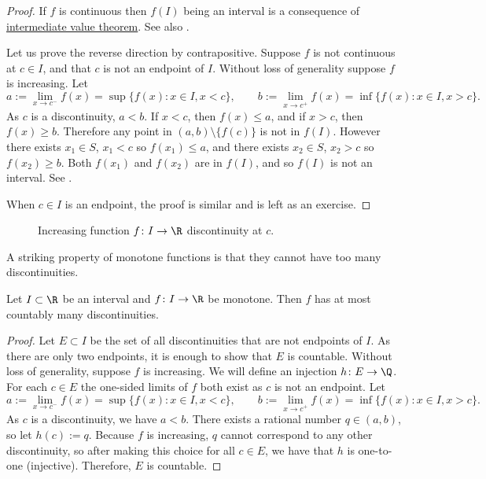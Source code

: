 \documentclass[12pt]{book}
\begin{document}
\begin{proof}
If $f$ is continuous then $f(I)$ being an interval is a consequence of
\hyperref[IVT:thm]{intermediate value theorem}.
See also
.

Let us prove the reverse direction by contrapositive.
Suppose $f$ is not continuous at $c \in I$,
and that $c$ is not an endpoint of $I$.
Without loss of generality suppose $f$ is increasing.
Let
\begin{equation*}
a := \lim_{x \to c^-} f(x) = \sup \{ f(x) : x \in I, x < c \} ,
\qquad
b := \lim_{x \to c^+} f(x) = \inf \{ f(x) : x \in I, x > c \} .
\end{equation*}
As $c$ is a discontinuity, $a < b$.
If $x < c$, then $f(x) \leq a$, and
if $x > c$, then $f(x) \geq b$.
Therefore
any point
in $(a,b) \setminus \{ f(c) \}$ is not in $f(I)$.
However there exists $x_1 \in S$, $x_1 < c$ so
$f(x_1) \leq a$, and there exists $x_2 \in S$, $x_2 > c$
so $f(x_2) \geq b$.
Both $f(x_1)$ and $f(x_2)$ are in $f(I)$,
and so $f(I)$ is not an interval.
See .

When $c \in I$ is an endpoint, the proof is similar and is left as an exercise.
\end{proof}

\begin{figure}[h!t]
\begin{center}

\caption{Increasing function $f \colon I \to \R$ discontinuity at
$c$.\label{fig:figinccont}}
\end{center}
\end{figure}

A striking property of monotone functions is that they cannot have
too many discontinuities.

\begin{cor} \label{cor:monotcountcont}
Let $I \subset \R$ be an interval and
$f \colon I \to \R$ be monotone.
Then $f$ has at most
countably many discontinuities.
\end{cor}

\begin{proof}
Let $E \subset I$ be the set of all discontinuities
that are not endpoints of $I$.
As there are
only two endpoints, it is enough to show that $E$ is countable.
Without loss of generality, suppose $f$ is increasing.
We will define an injection $h \colon E \to \Q$.
For each $c \in E$
the one-sided limits of $f$ both exist as $c$ is not an endpoint.
Let
\begin{equation*}
a := \lim_{x \to c^-} f(x) = \sup \{ f(x) : x \in I, x < c \} ,
\qquad
b := \lim_{x \to c^+} f(x) = \inf \{ f(x) : x \in I, x > c \} .
\end{equation*}
As $c$ is a discontinuity, we have $a < b$.
There exists a rational number $q \in (a,b)$, so let $h(c) := q$.
Because $f$ is increasing, $q$ cannot correspond to any
other discontinuity, so after making this choice for all $c \in E$, we have
that $h$ is one-to-one (injective).
Therefore, $E$ is countable.
\end{proof}
\end{document}
